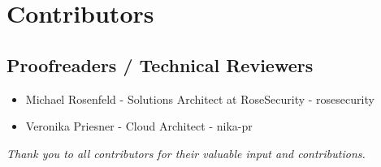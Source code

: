 \chapter*{Contributors}

\section*{Proofreaders / Technical Reviewers}
\begin{itemize}[noitemsep]
    \item Michael Rosenfeld - Solutions Architect at RoseSecurity - rosesecurity
    \item Veronika Priesner - Cloud Architect - nika-pr
\end{itemize}


\vspace{0.5cm}
\begin{center}
\small\emph{Thank you to all contributors for their valuable input and contributions.}
\end{center}

\clearpage
